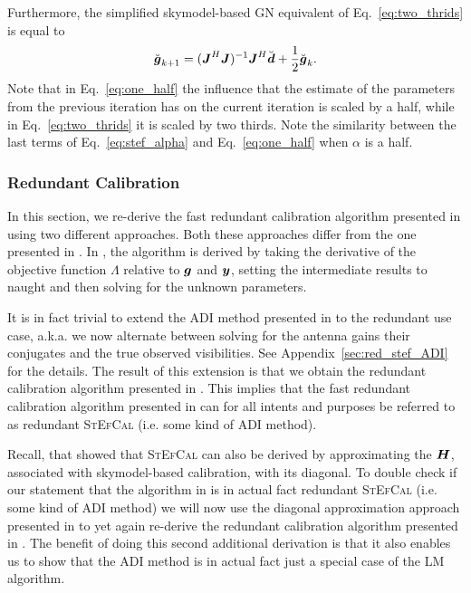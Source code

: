 \documentclass[useAMS,usenatbib]{mn2e}
\newcommand{\bg}{\bmath{g}}
\newcommand{\bd}{\bmath{d}}
\newcommand{\by}{\bmath{y}}
\newcommand{\bJ}{\bmath{J}}
\newcommand{\bH}{\bmath{H}}
\begin{document}
Furthermore, the simplified skymodel-based GN equivalent of Eq.~\eqref{eq:two_thrids} is equal to
\citep{Smirnov2015}
\begin{equation}
\label{eq:one_half}
\breve{\bg}_{k+1} = (\bJ^H\bJ)^{-1}\bJ^H\breve{\bd} + \frac{1}{2}\breve{\bg}_{k}. 
\end{equation}
Note that in Eq.~\eqref{eq:one_half} the influence that the estimate of the parameters from the previous iteration has on the current iteration is scaled by a half, while
in Eq.~\eqref{eq:two_thrids} it is scaled by two thirds. Note the similarity between the last terms of Eq.~\eqref{eq:stef_alpha} and Eq.~\eqref{eq:one_half} when $\alpha$ is a half.

\subsubsection{Redundant Calibration}
\label{sec:red_c}
In this section, we re-derive the fast redundant calibration algorithm presented in \citet{Marthi2014} using two different approaches. Both these approaches differ from the one presented in \citet{Marthi2014}. In \citet{Marthi2014}, the algorithm is derived by taking the derivative of the 
objective function $\Lambda$ relative to $\bg$ and $\by$, setting the intermediate results to naught and then solving for the unknown parameters. 

It is in fact trivial to extend the ADI method presented in \citet{Salvini2014} to the redundant use case, a.k.a. we now alternate between solving for the antenna gains their conjugates and the true observed visibilities.
See Appendix~\ref{sec:red_stef_ADI} for the details. The result of this extension is that we obtain the redundant calibration algorithm presented in \citet{Marthi2014}. This implies that the fast redundant calibration algorithm presented in \citet{Marthi2014} can for all intents and purposes be referred to as redundant \textsc{StEfCal} (i.e. some kind of ADI method).

Recall, that \citet{Smirnov2015} showed that \textsc{StEfCal} can also be derived by approximating the $\bH$, associated with skymodel-based calibration, with 
its diagonal. To double check if our statement that the algorithm in \citet{Marthi2014} is in actual fact redundant \textsc{StEfCal} (i.e. some kind of ADI method) we will now use the diagonal approximation approach presented in \citet{Smirnov2015} to yet again re-derive the redundant calibration algorithm presented in \citet{Marthi2014}.
The benefit of doing this second additional derivation is that it also enables us to show that the ADI method is in actual fact just a special case of the LM algorithm.
\end{document}
